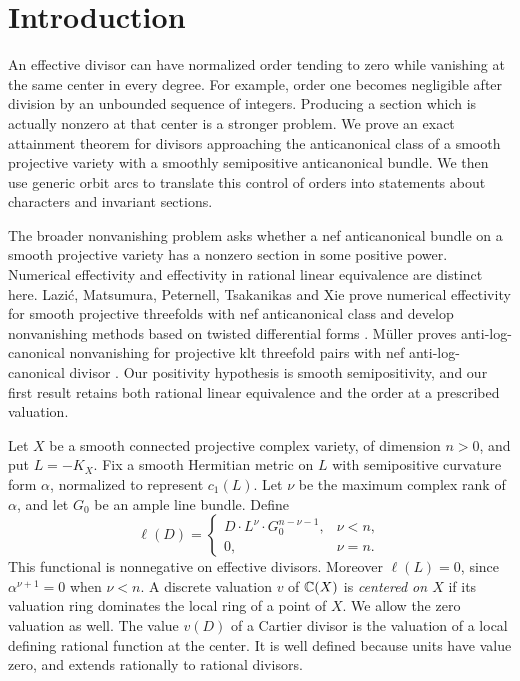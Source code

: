 \section{Introduction}
\label{V:introduction}

An effective divisor can have normalized order tending to zero while
vanishing at the same center in every degree. For example, order one
becomes negligible after division by an unbounded sequence of integers.
Producing a section which is actually nonzero at that center is a stronger
problem. We prove an exact attainment theorem for divisors approaching
the anticanonical class of a smooth projective variety with a smoothly
semipositive anticanonical bundle. We then use generic orbit arcs to
translate this control of orders into statements about characters and
invariant sections.

The broader nonvanishing problem asks whether a nef anticanonical
bundle on a smooth projective variety has a nonzero section in some
positive power.  Numerical effectivity and effectivity in rational
linear equivalence are distinct here.  Lazi\'c, Matsumura, Peternell,
Tsakanikas and Xie prove numerical effectivity for smooth projective
threefolds with nef anticanonical class and develop nonvanishing methods based on twisted
differential forms \cite[Theorem~A and Section~5]{LMPTX2023}.
M\"uller proves anti-log-canonical nonvanishing for projective klt
threefold pairs with nef anti-log-canonical divisor \cite[Corollary~B]{Muller2025}.
Our positivity hypothesis is smooth semipositivity, and our first
result retains both rational linear equivalence and the order at a
prescribed valuation.

Let $X$ be a smooth connected projective complex variety, of dimension
$n>0$, and put $L=-K_X$. Fix a smooth Hermitian metric on $L$ with
semipositive curvature form $\alpha$, normalized to represent $c_1(L)$.
Let $\nu$ be the maximum complex rank of $\alpha$, and let $G_0$ be an
ample line bundle. Define
\begin{equation}\label{V:null-functional}
 \ell(D)=
 \begin{cases}
 D\cdot L^\nu\cdot G_0^{n-\nu-1},&\nu<n,\\
 0,&\nu=n.
 \end{cases}
\end{equation}
This functional is nonnegative on effective divisors. Moreover
$\ell(L)=0$, since $\alpha^{\nu+1}=0$ when $\nu<n$.
A discrete valuation $v$ of $\mathbb C(X)$ is \emph{centered on $X$} if its
valuation ring dominates the local ring of a point of $X$. We allow the
zero valuation as well. The value $v(D)$ of a Cartier divisor is the
valuation of a local defining rational function at the center. It is
well defined because units have value zero, and extends rationally to
rational divisors.

